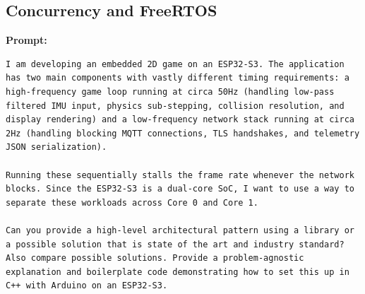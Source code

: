 \subsection{Concurrency and FreeRTOS}

\textbf{Prompt:}
\begin{lstlisting}[language={}, breaklines=true]
I am developing an embedded 2D game on an ESP32-S3. The application has two main components with vastly different timing requirements: a high-frequency game loop running at circa 50Hz (handling low-pass filtered IMU input, physics sub-stepping, collision resolution, and display rendering) and a low-frequency network stack running at circa 2Hz (handling blocking MQTT connections, TLS handshakes, and telemetry JSON serialization).

Running these sequentially stalls the frame rate whenever the network blocks. Since the ESP32-S3 is a dual-core SoC, I want to use a way to separate these workloads across Core 0 and Core 1.

Can you provide a high-level architectural pattern using a library or a possible solution that is state of the art and industry standard?
Also compare possible solutions. Provide a problem-agnostic explanation and boilerplate code demonstrating how to set this up in C++ with Arduino on an ESP32-S3.
\end{lstlisting}

